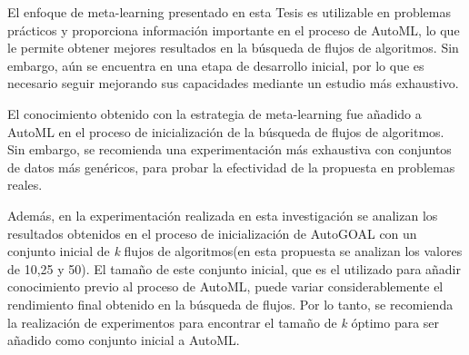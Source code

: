 \begin{recomendations}
    El enfoque de meta-learning presentado en esta Tesis es utilizable en
    problemas prácticos y proporciona información importante en el proceso de
    AutoML, lo que le permite obtener mejores resultados en la búsqueda de
    flujos de algoritmos. Sin embargo, aún se encuentra en una etapa de
    desarrollo inicial, por lo que es necesario seguir mejorando sus capacidades
    mediante un estudio más exhaustivo.

    El conocimiento obtenido con la estrategia de meta-learning fue añadido a
    AutoML en el proceso de inicialización de la búsqueda de flujos de
    algoritmos. Sin embargo, se recomienda una experimentación más exhaustiva
    con conjuntos de datos más genéricos, para probar la efectividad de la
    propuesta en problemas reales.

    Además, en la experimentación realizada en esta investigación se analizan
    los resultados obtenidos en el proceso de inicialización de AutoGOAL con un
    conjunto inicial de \emph{k} flujos de algoritmos(en esta propuesta se
    analizan los valores de 10,25 y 50). El tamaño de este conjunto inicial,
    que es el utilizado para añadir conocimiento previo al proceso de
    AutoML, puede variar considerablemente el rendimiento final obtenido en la
    búsqueda de flujos. Por lo tanto, se recomienda la realización
    de experimentos para encontrar el tamaño de \emph{k} óptimo para ser
    añadido como conjunto inicial a AutoML.
\end{recomendations}
